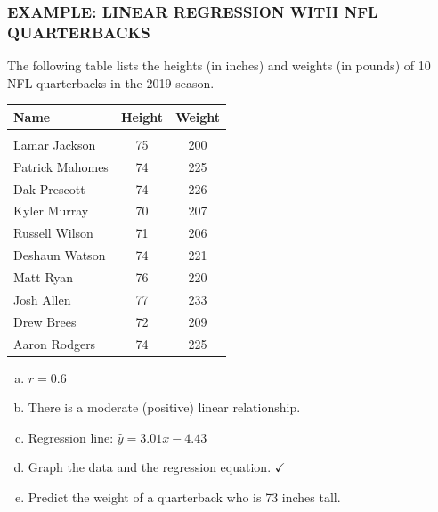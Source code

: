\documentclass[8pt]{beamer}
\newcommand{\extitle}[1]{\frametitle{\fontfamily{fvs}\selectfont \small\color{black!70!blue!80!cyan}\uppercase{\bfseries Example: #1}}}
\def\solblank{\begin{tcolorbox}[colframe=black!50!blue!50!cyan,
colback=white,
bottomrule=0mm,
rightrule=0mm,
sharp corners=all] 
\vspace{6in}
\text{}
\end{tcolorbox}}
\begin{document}
\begin{frame}
\extitle{Linear Regression with NFL Quarterbacks}
The following table lists the heights (in inches) and weights (in pounds) of 10 NFL quarterbacks in the 2019 season.
{\footnotesize\begin{center}
\begin{tabular}{l c c}
\textbf{Name} & \textbf{Height} & \textbf{Weight}\\
\hline
& & \\
Lamar Jackson & 75 & 200\\
Patrick Mahomes & 74 & 225\\
Dak Prescott & 74 & 226\\
Kyler Murray & 70 & 207\\
Russell Wilson & 71 & 206\\
Deshaun Watson & 74 & 221\\
Matt Ryan & 76 & 220\\
Josh Allen & 77 & 233\\
Drew Brees & 72 & 209\\
Aaron Rodgers & 74 & 225\\
\end{tabular}
\end{center}}
\begin{enumerate}[(a)]
\item $r = 0.6$
\item There is a moderate (positive) linear relationship.
\item Regression line: $\hat{y} = 3.01x - 4.43$
\item Graph the data and the regression equation. $\checkmark$
\item Predict the weight of a quarterback who is 73 inches tall.
\end{enumerate}

\solblank
\end{frame}
\end{document}
